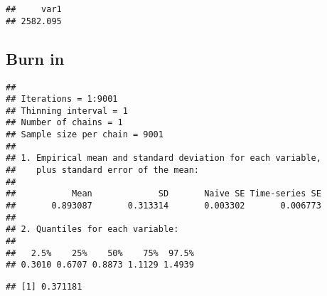 \documentclass[]{book}
\newenvironment{Shaded}{\begin{snugshade}}{\end{snugshade}}
\newcommand{\KeywordTok}[1]{\textcolor[rgb]{0.13,0.29,0.53}{\textbf{#1}}}
\newcommand{\DecValTok}[1]{\textcolor[rgb]{0.00,0.00,0.81}{#1}}
\newcommand{\FloatTok}[1]{\textcolor[rgb]{0.00,0.00,0.81}{#1}}
\newcommand{\StringTok}[1]{\textcolor[rgb]{0.31,0.60,0.02}{#1}}
\newcommand{\CommentTok}[1]{\textcolor[rgb]{0.56,0.35,0.01}{\textit{#1}}}
\newcommand{\OperatorTok}[1]{\textcolor[rgb]{0.81,0.36,0.00}{\textbf{#1}}}
\newcommand{\NormalTok}[1]{#1}
\begin{document}
\begin{verbatim}
##     var1 
## 2582.095
\end{verbatim}

\subsection{Burn in}\label{burn-in}

\begin{Shaded}
\end{Shaded}

\begin{verbatim}
## 
## Iterations = 1:9001
## Thinning interval = 1 
## Number of chains = 1 
## Sample size per chain = 9001 
## 
## 1. Empirical mean and standard deviation for each variable,
##    plus standard error of the mean:
## 
##           Mean             SD       Naive SE Time-series SE 
##       0.893087       0.313314       0.003302       0.006773 
## 
## 2. Quantiles for each variable:
## 
##   2.5%    25%    50%    75%  97.5% 
## 0.3010 0.6707 0.8873 1.1129 1.4939
\end{verbatim}

\begin{Shaded}
\end{Shaded}

\begin{verbatim}
## [1] 0.371181
\end{verbatim}


\end{document}
